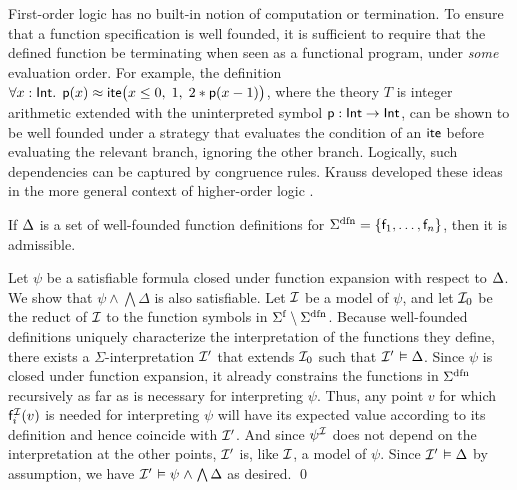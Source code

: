 First-order logic has no built-in notion of computation or termination. To ensure
that a function specification is well founded, it is sufficient to require that
the defined function be terminating when seen as a functional program, under \emph{some}
evaluation order. For example, the definition
$\forall x : {\mathsf{Int}}.\;\,
\mathsf{p}( x ) \approx \mathsf{ite}\bigl( x \leq 0,\allowbreak\;  1,\allowbreak\;
  2 * \mathsf{p}( x - 1 ) \bigr)$,
where the theory $T$ is integer arithmetic extended with the uninterpreted symbol
$\mathsf{p}:\mathsf{Int} \rightarrow \mathsf{Int}$, can be shown to be well founded under a strategy that
evaluates the condition of an $\mathsf{ite}$ before evaluating the relevant branch,
ignoring the other branch. Logically, such dependencies can be captured by
congruence rules. Krauss developed these ideas in the more general context of
higher-order logic \cite[Section 2]{krauss-2009-phd}.

\begin{theorem}\label{thm:adm}
If $\DDD$ is a set of well-founded function definitions for\/
$\sfundefs{\Sigma} = \{\con{f}_1,\dotsc,\con{f}_n\}$, then it is admissible.
\end{theorem}

\begin{proofsketch}
Let $\psi$ be a satisfiable formula closed under function expansion with
respect to $\DDD$. We show that $\psi \wedge \bigwedge \Delta$ is also
satisfiable. Let $\mathcal{I}$ be a model of $\psi$, and
let $\mathcal{I}_0$ be the reduct of $\mathcal{I}$ to the function symbols in $\sfuns{\Sigma} \setminus
\sfundefs{\Sigma}$. Because well-founded definitions uniquely characterize
the interpretation of the functions they define, there exists a
$\Sigma$-interpretation ${\mathcal{I}'}$ that extends $\mathcal{I}_0$ such that $\J \models \Delta$.
%
Since $\psi$ is closed under function expansion, it already constrains the
functions in $\sfundefs{\Sigma}$ recursively as far as is
necessary for interpreting $\psi$. Thus, any point $v$ for which
$\mathsf{f}_i^{\mathcal{I}}(v)$ is needed for interpreting $\psi$ will have its
expected value according to its definition and hence coincide with ${\mathcal{I}'}$.
And since $\psi^{\mathcal{I}}$ does not depend on the interpretation at the other
points, ${\mathcal{I}'}$ is, like $\mathcal{I}$, a model of $\psi$.
Since $\J \models \Delta$ by assumption, we have $\J \models \psi \wedge
\bigwedge \Delta$ as desired.
\qed
\end{proofsketch}


